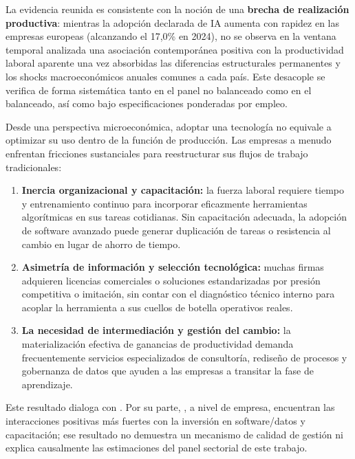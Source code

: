 \documentclass[12pt,a4paper]{article}
\begin{document}
La evidencia reunida es consistente con la noción de una \textbf{brecha de realización productiva}: mientras la adopción declarada de IA aumenta con rapidez en las empresas europeas (alcanzando el 17,0\% en 2024), no se observa en la ventana temporal analizada una asociación contemporánea positiva con la productividad laboral aparente una vez absorbidas las diferencias estructurales permanentes y los shocks macroeconómicos anuales comunes a cada país. Este desacople se verifica de forma sistemática tanto en el panel no balanceado como en el balanceado, así como bajo especificaciones ponderadas por empleo.

Desde una perspectiva microeconómica, adoptar una tecnología no equivale a optimizar su uso dentro de la función de producción. Las empresas a menudo enfrentan fricciones sustanciales para reestructurar sus flujos de trabajo tradicionales:

\begin{enumerate}

    \item \textbf{Inercia organizacional y capacitación:} la fuerza laboral requiere tiempo y entrenamiento continuo para incorporar eficazmente herramientas algorítmicas en sus tareas cotidianas. Sin capacitación adecuada, la adopción de software avanzado puede generar duplicación de tareas o resistencia al cambio en lugar de ahorro de tiempo.

    \item \textbf{Asimetría de información y selección tecnológica:} muchas firmas adquieren licencias comerciales o soluciones estandarizadas por presión competitiva o imitación, sin contar con el diagnóstico técnico interno para acoplar la herramienta a sus cuellos de botella operativos reales.

    \item \textbf{La necesidad de intermediación y gestión del cambio:} la materialización efectiva de ganancias de productividad demanda frecuentemente servicios especializados de consultoría, rediseño de procesos y gobernanza de datos que ayuden a las empresas a transitar la fase de aprendizaje.

\end{enumerate}

Este resultado dialoga con \citet{yilmaz2026dataset}. Por su parte, \citet{aldasoro2026adoption}, a nivel de empresa, encuentran las interacciones positivas más fuertes con la inversión en software/datos y capacitación; ese resultado no demuestra un mecanismo de calidad de gestión ni explica causalmente las estimaciones del panel sectorial de este trabajo.
\end{document}
